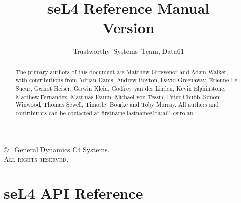 \documentclass[a4paper,11pt,twoside]{report}
\date{}
\date{}
\newcommand{\version}{}
\begin{document}
  \title{seL4 Reference Manual\\Version \version}

  \author{Trustworthy~Systems~Team, Data61}
  \date{\commitdate}

  \maketitle

  \thispagestyle{empty}

  \vfill

  \copyright~{\commityear} General Dynamics C4 Systems.\\

  \textsc{All rights reserved}.

  \thispagestyle{empty}
  \vfill
  \renewcommand{\abstractname}{Acknowledgements}
  \begin{abstract}
The primary authors of this document are Matthew Grosvenor and Adam Walker,
with contributions from Adrian Danis, Andrew Boyton, David Greenaway, Etienne
Le Sueur, Gernot Heiser, Gerwin Klein, Godfrey van der Linden, Kevin
Elphinstone, Matthew Fernandez, Matthias Daum, Michael von Tessin, Peter Chubb,
Simon Winwood, Thomas Sewell, Timothy Bourke and Toby Murray. All authors 
and contributors can be contacted at firstname.lastname@data61.csiro.au.
  \end{abstract}
  \thispagestyle{empty}

  \cleardoublepage
  \setcounter{page}{1}
  \tableofcontents
  \listoftables
  \listoffigures

  \cleardoublepage
  \setcounter{page}{1}

  

  
  
  
  
  
  
  
  

  \chapter{seL4 API Reference}
  \label{sec:api_reference}
  

  \cleardoublepage
  
  
\end{document}
